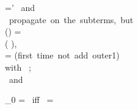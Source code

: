 \begin{RuleFrame}
\begin{MDefinition}{\classB
{}=\classB'}
\classB{}
\mbox{ and }
\e{}
\\\mbox{ propagate on the subterms, but}\\
(\C\colon\e)
=\\\quad
\C\colon(\e
{}),\\

\Cb{\h\members}
\!=\!
 \mbox{(first time not add outer1)}
\\\quad\mbox{with }
\p;\emptyset\vdash \Cb{\h\members}\ReduceArrow{}\ct
\\
\mbox{ and }

\Path_0
=\Norm{}
\mbox{ iff }
\Norm{}=\Norm\p{\Path}



\end{MDefinition}
\\







\end{RuleFrame}

